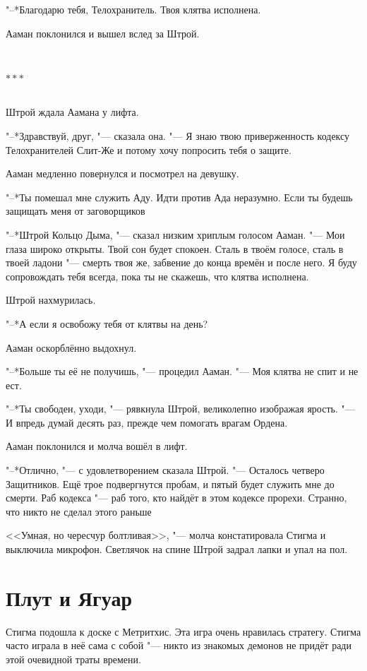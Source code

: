 \documentclass[a4paper,10pt]{book}
\newcommand{\ldotst}{\so{...}\xspace}
\newcommand{\razd}{~\\{\centering\Large\bfseries$\ast \ast \ast$\par}~\\}
\begin{document}
"--*Благодарю тебя, Телохранитель. Твоя клятва исполнена.

Ааман поклонился и вышел вслед за Штрой.

\razd

Штрой ждала Аамана у лифта.

"--*Здравствуй, друг, "--- сказала она. "--- Я знаю твою приверженность кодексу 
Телохранителей Слит-Же и потому хочу попросить тебя о защите.

Ааман медленно повернулся и посмотрел на девушку.

"--*Ты помешал мне служить Аду. Идти против Ада неразумно. Если ты будешь 
защищать меня от заговорщиков\ldotst

"--*Штрой Кольцо Дыма, "--- сказал низким хриплым голосом Ааман. "--- Мои глаза 
широко открыты. Твой сон будет спокоен. Сталь в твоём голосе, сталь в твоей 
ладони "--- смерть твоя же, забвение до конца времён и после него. Я буду 
сопровождать тебя всегда, пока ты не скажешь, что клятва исполнена.

Штрой нахмурилась.

"--*А если я освобожу тебя от клятвы на день?

Ааман оскорблённо выдохнул.

"--*Больше ты её не получишь, "--- процедил Ааман. "--- Моя клятва не спит и не 
ест.

"--*Ты свободен, уходи, "--- рявкнула Штрой, великолепно изображая ярость. "--- 
И впредь думай десять раз, прежде чем помогать врагам Ордена.

Ааман поклонился и молча вошёл в лифт.

"--*Отлично, "--- с удовлетворением сказала Штрой. "--- Осталось четверо 
Защитников. Ещё трое подвергнутся пробам, и пятый будет служить мне до смерти. 
Раб кодекса "--- раб того, кто найдёт в этом кодексе прорехи. Странно, что 
никто не сделал этого раньше\ldotst

<<Умная, но чересчур болтливая>>, "--- молча констатировала Стигма и выключила 
микрофон. Светлячок на спине Штрой задрал лапки и упал на пол.

\section{Плут и Ягуар}

Стигма подошла к доске с Метритхис. Эта игра очень нравилась стратегу. Стигма 
часто играла в неё сама с собой 
"--- никто из знакомых демонов не придёт ради 
этой очевидной траты времени.
\end{document}
